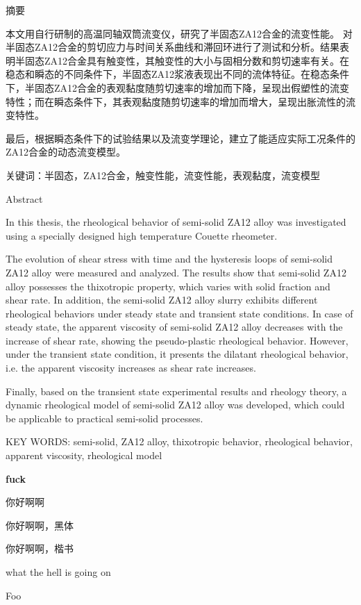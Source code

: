 \documentclass[a4paper, 12pt]{article}
\begin{document}
\vspace*{12pt}
\begin{center}
\LARGE 摘\quad 要
\end{center}

{
\par 本文用自行研制的高温同轴双筒流变仪，研究了半固态ZA12合金的流变性能。
对半固态ZA12合金的剪切应力与时间关系曲线和滞回环进行了测试和分析。结果表明半固态ZA12合金具有触变性，其触变性的大小与固相分数和剪切速率有关。在稳态和瞬态的不同条件下，半固态ZA12浆液表现出不同的流体特征。在稳态条件下，半固态ZA12合金的表观黏度随剪切速率的增加而下降，呈现出假塑性的流变特性；而在瞬态条件下，其表观黏度随剪切速率的增加而增大，呈现出胀流性的流变特性。
\par 最后，根据瞬态条件下的试验结果以及流变学理论，建立了能适应实际工况条件的ZA12合金的动态流变模型。\newline

\noindent 关键词：半固态，ZA12合金，触变性能，流变性能，表观黏度，流变模型
}
\newpage
{}
\vspace*{12pt}
\begin{center}
Abstract
\end{center}
\par In this thesis, the rheological behavior of semi-solid ZA12 alloy was investigated using a specially designed high temperature Couette rheometer.
\par The evolution of shear stress with time and the hysteresis loops of semi-solid ZA12 alloy were measured and analyzed. The results show that semi-solid ZA12 alloy possesses the thixotropic property, which varies with solid fraction and shear rate. In addition, the semi-solid ZA12 alloy slurry exhibits different rheological behaviors under steady state and transient state conditions. In case of steady state, the apparent viscosity of semi-solid ZA12 alloy decreases with the increase of shear rate, showing the pseudo-plastic rheological behavior. However, under the transient state condition, it presents the dilatant rheological behavior, i.e. the apparent viscosity increases as shear rate increases.
\par Finally, based on the transient state experimental results and rheology theory, a dynamic rheological model of semi-solid ZA12 alloy was developed, which could be applicable to practical semi-solid processes.\newline

\noindent KEY WORDS: semi-solid, ZA12 alloy, thixotropic behavior, rheological behavior, apparent viscosity, rheological model
\newpage

\vspace*{36pt}
\tableofcontents

\newpage
\vspace{5cm}

\textbf{fuck}

\bigskip
你好啊啊

{\heiti 你好啊啊，黑体}

{\kaishu 你好啊啊，楷书}


what the hell is going on 

{\fontsize{50}{60}\selectfont Foo}
\end{document}
